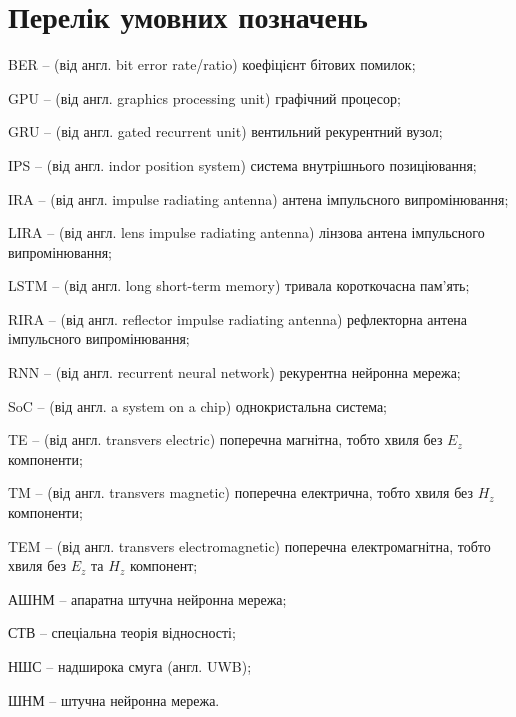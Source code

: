 \chapter*{Перелік умовних позначень}


BER -- (від англ. bit error rate/ratio) коефіцієнт бітових помилок;

GPU -- (від англ. graphics processing unit) графічний процесор;

GRU -- (від англ. gated recurrent unit) вентильний рекурентний вузол;

IPS -- (від англ. indor position system) система внутрішнього позиціювання;

IRA -- (від англ. impulse radiating antenna) антена імпульсного випромінювання;

LIRA -- (від англ. lens impulse radiating antenna) лінзова антена імпульсного
випромінювання;

LSTM -- (від англ. long short-term memory) тривала короткочасна пам'ять;

RIRA -- (від англ. reflector impulse radiating antenna) рефлекторна антена 
імпульсного випромінювання;

RNN -- (від англ. recurrent neural network) рекурентна нейронна мережа;

SoC -- (від англ. a system on a chip) однокристальна система;

TE -- (від англ. transvers electric) поперечна магнітна, тобто хвиля без 
$ E_z $ компоненти;

TM -- (від англ. transvers magnetic) поперечна електрична, тобто хвиля без 
$ H_z $ компоненти;

TEM -- (від англ. transvers electromagnetic) поперечна електромагнітна, тобто 
хвиля  без $ E_z $ та $ H_z $ компонент;

АШНМ -- апаратна штучна нейронна мережа;

СТВ -- спеціальна теорія відносності;

НШС -- надширока смуга (англ. UWB);

ШНМ -- штучна нейронна мережа.
